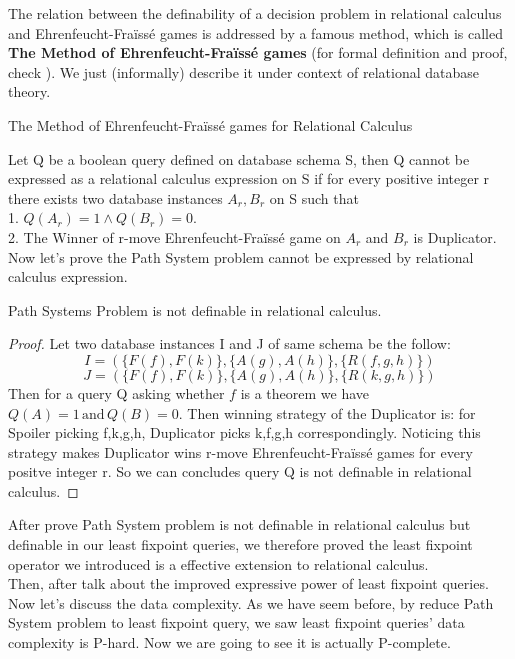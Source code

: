 The relation between the definability of a decision problem in relational calculus and Ehrenfeucht-Fra\"iss\'e games is addressed by a famous method, which is called \textbf{The Method of Ehrenfeucht-Fra\"iss\'e games} (for formal definition and proof, check \cite{kolaitis1}). We just (informally) describe it under context of relational database theory.\\

\begin{description}
\item[The Method of Ehrenfeucht-Fra\"iss\'e games for Relational Calculus]
\end{description}
Let Q be a boolean query defined on database schema S, then Q cannot be expressed as a relational calculus expression on S if for every positive integer r there exists two database instances $A_r, B_r$ on S such that\\
1. $Q(A_r)=1\land Q(B_r)=0$.\\
2. The Winner of r-move Ehrenfeucht-Fra\"iss\'e game on $A_r$ and $B_r$ is Duplicator.\\

Now let's prove the Path System problem cannot be expressed by relational calculus expression.

\begin{claim}
Path Systems Problem is not definable in relational calculus.
\end{claim}

\begin{proof}
Let two database instances I and J of same schema be the follow:
$$I=(\{F(f), F(k)\}, \{A(g),A(h)\},\{R(f,g,h)\})$$
$$J=(\{F(f), F(k)\}, \{A(g),A(h)\}, \{R(k,g,h)\})$$
Then for a query Q asking whether $f$ is a theorem we have $Q(A)=1 \, \text{and} \, Q(B)=0$. Then winning strategy of the Duplicator is: for Spoiler picking f,k,g,h, Duplicator picks k,f,g,h correspondingly. Noticing this strategy makes Duplicator wins r-move Ehrenfeucht-Fra\"iss\'e games for every positve integer r. So we can concludes query Q is not definable in relational calculus.
\end{proof}

After prove Path System problem is not definable in relational calculus but definable in our least fixpoint queries, we therefore proved the least fixpoint operator we introduced is a effective extension to relational calculus.\\

Then, after talk about the improved expressive power of least fixpoint queries. Now let's discuss the data complexity. As we have seem before, by reduce Path System problem to least fixpoint query, we saw least fixpoint queries' data complexity is P-hard. Now we are going to see it is actually P-complete.\\

